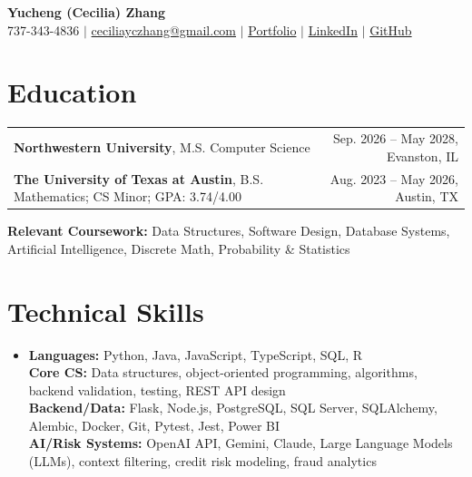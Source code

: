 \documentclass[letterpaper,10pt]{article}
\begin{document}
\begin{center}
{\Large\textbf{Yucheng (Cecilia) Zhang}}\\[-1pt]
\small 737-343-4836 $|$ \href{mailto:ceciliayczhang@gmail.com}{ceciliayczhang@gmail.com} $|$
\href{https://yczhangcc.github.io/yuchengzhang_portfolio/}{Portfolio} $|$
\href{https://www.linkedin.com/in/yczcecilia/}{LinkedIn} $|$
\href{https://github.com/yczhangcc}{GitHub}
\end{center}
\vspace{-8pt}

\section{Education}
{\small
\begin{tabular*}{0.985\textwidth}[t]{l@{\extracolsep{\fill}}r}
\textbf{Northwestern University}, M.S. Computer Science & Sep. 2026 -- May 2028, Evanston, IL \\
\textbf{The University of Texas at Austin}, B.S. Mathematics; CS Minor; GPA: 3.74/4.00 & Aug. 2023 -- May 2026, Austin, TX \\
\end{tabular*}}
\vspace{-2pt}
\footnotesize{\textbf{Relevant Coursework:} Data Structures, Software Design, Database Systems, Artificial Intelligence, Discrete Math, Probability \& Statistics}
\vspace{-5pt}

\section{Technical Skills}
\begin{itemize}[leftmargin=0.11in,label={},topsep=1pt,itemsep=0pt]
\footnotesize\item{
\textbf{Languages:} Python, Java, JavaScript, TypeScript, SQL, R \\
\textbf{Core CS:} Data structures, object-oriented programming, algorithms, backend validation, testing, REST API design \\
\textbf{Backend/Data:} Flask, Node.js, PostgreSQL, SQL Server, SQLAlchemy, Alembic, Docker, Git, Pytest, Jest, Power BI \\
\textbf{AI/Risk Systems:} OpenAI API, Gemini, Claude, Large Language Models (LLMs), context filtering, credit risk modeling, fraud analytics
}
\end{itemize}
\vspace{-7pt}
\end{document}
